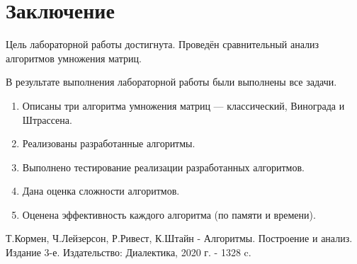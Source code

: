 \documentclass[12pt, a4paper]{article}
\begin{document}
\newpage
\section*{Заключение}
Цель лабораторной работы достигнута. Проведён сравнительный анализ алгоритмов умножения матриц.

В результате выполнения лабораторной работы были выполнены все задачи.
\begin{enumerate}
\item Описаны три алгоритма умножения матриц --- классический, Винограда и Штрассена.
\item Реализованы разработанные алгоритмы.
\item Выполнено тестирование реализации разработанных алгоритмов.
\item Дана оценка сложности алгоритмов.
\item Оценена эффективность каждого алгоритма (по памяти и времени).
\end{enumerate}
\newpage
\begin{center}
\begin{thebibliography}{}
Т.Кормен, Ч.Лейзерсон, Р.Ривест, К.Штайн - Алгоритмы. Построение 
и анализ. Издание 3-е. Издательство: Диалектика, 2020 г. - 1328 c.
\end{thebibliography}
\end{center}
\end{document}
